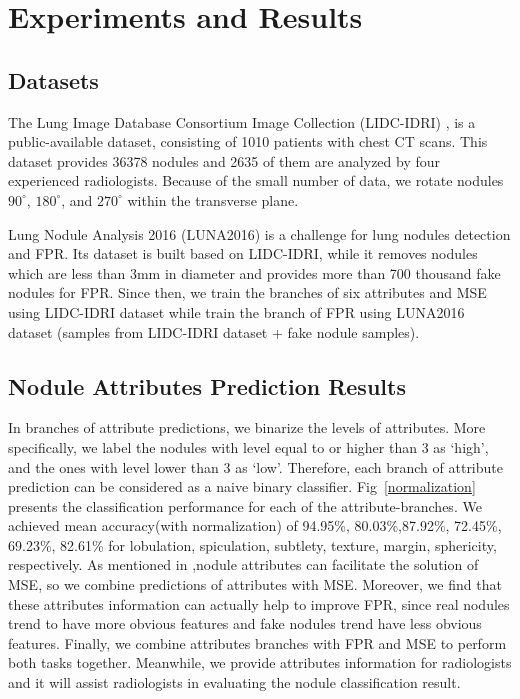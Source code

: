 \documentclass[runningheads]{llncs}
\begin{document}
\section{Experiments and Results}
\label{exp}
\subsection{Datasets}
The Lung Image Database Consortium Image Collection (LIDC-IDRI) \cite{Armato2010WE}, is a public-available dataset, consisting of 1010 patients with chest CT scans. This dataset provides 36378 nodules and 2635 of them are analyzed by four experienced radiologists. Because of the small number of data, we rotate nodules $90^{\circ}$, $180^{\circ}$, and $270^{\circ}$ within the transverse plane.

Lung Nodule Analysis 2016 (LUNA2016) \cite{Aaa2016Validation} is a challenge for lung nodules detection and FPR. Its dataset is built based on LIDC-IDRI, while it removes nodules which are less than 3mm in diameter and provides more than 700 thousand fake nodules for FPR. Since then, we train the branches of six attributes and MSE using LIDC-IDRI dataset while train the branch of FPR using LUNA2016 dataset (samples from LIDC-IDRI dataset + fake nodule samples).


\subsection{Nodule Attributes Prediction Results}
In branches of attribute predictions, we binarize the  levels of attributes. More specifically, we label the nodules with level equal to or higher than 3 as `high', and the ones with level lower than 3 as `low'. Therefore, each branch of attribute prediction can be considered as a naive binary classifier.
Fig~\ref{normalization} presents the classification performance for each of the attribute-branches. We achieved mean accuracy(with normalization) of 94.95\%, 80.03\%,87.92\%, 72.45\%, 69.23\%, 82.61\% for lobulation, spiculation, subtlety, texture, margin, sphericity, respectively. As mentioned in \cite{Hussein2017Risk},nodule attributes can facilitate the solution of MSE, so we combine predictions of attributes with MSE.  Moreover, we find that these attributes information can actually help to improve FPR, since real nodules trend to have more obvious features and fake nodules trend have less obvious features. Finally, we combine attributes branches with FPR and MSE to perform both tasks together.
Meanwhile, we provide attributes information for radiologists and it will assist radiologists in evaluating the nodule classification result.
\end{document}
